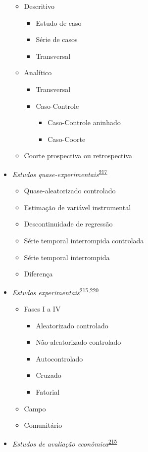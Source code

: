 \documentclass[
  a4paper,
]{book}
\begin{document}
\begin{itemize}
  \begin{itemize}
  \item
    Descritivo

    \begin{itemize}
    \item
      Estudo de caso
    \item
      Série de casos
    \item
      Transversal
    \end{itemize}
  \item
    Analítico

    \begin{itemize}
    \item
      Transversal
    \item
      Caso-Controle

      \begin{itemize}
      \item
        Caso-Controle aninhado
      \item
        Caso-Coorte
      \end{itemize}
    \end{itemize}
  \item
    Coorte prospectiva ou retrospectiva
  \end{itemize}
\item
  \emph{Estudos quase-experimentais}\textsuperscript{\protect\hyperlink{ref-reeves2017}{217}}

  \begin{itemize}
  \item
    Quase-aleatorizado controlado
  \item
    Estimação de variável instrumental
  \item
    Descontinuidade de regressão
  \item
    Série temporal interrompida controlada
  \item
    Série temporal interrompida
  \item
    Diferença
  \end{itemize}
\item
  \emph{Estudos experimentais}\textsuperscript{\protect\hyperlink{ref-Suxfct2014}{215},\protect\hyperlink{ref-Chidambaram2019}{220}}

  \begin{itemize}
  \item
    Fases I a IV

    \begin{itemize}
    \item
      Aleatorizado controlado
    \item
      Não-aleatorizado controlado
    \item
      Autocontrolado
    \item
      Cruzado
    \item
      Fatorial
    \end{itemize}
  \item
    Campo
  \item
    Comunitário
  \end{itemize}
\item
  \emph{Estudos de avaliação econômica}\textsuperscript{\protect\hyperlink{ref-Suxfct2014}{215}}


\end{itemize}
\end{document}
